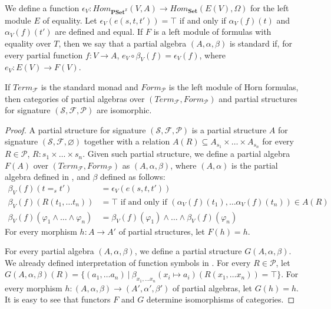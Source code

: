 \documentclass[reqno]{amsart}
\theoremstyle{definition}
\theoremstyle{remark}
\newcommand{\cat}[1]{\mathbf{#1}}
\newcommand{\Set}{\cat{Set}}
\newcommand{\PSet}{\cat{PSet}}
\numberwithin{figure}{section}
\begin{document}
We define a function $\epsilon_V : Hom_{\PSet^\mathcal{S}}(V,A) \to Hom_\Set(E(V),\Omega)$ for the left module $E$ of equality.
Let $\epsilon_V(e(s,t,t')) = \top$ if and only if $\alpha_V(f)(t)$ and $\alpha_V(f)(t')$ are defined and equal.
If $F$ is a left module of formulas with equality over $T$, then we say that a partial algebra $(A,\alpha,\beta)$ is standard
    if, for every partial function $f : V \to A$, $e_V \circ \beta_V(f) = \epsilon_V(f)$, where $e_V : E(V) \to F(V)$.

\begin{lem}
If $Term_\mathcal{F}$ is the standard monad and $Form_\mathcal{P}$ is the left module of Horn formulas,
    then categories of partial algebras over $(Term_\mathcal{F},Form_\mathcal{P})$ and partial structures for signature $(\mathcal{S},\mathcal{F},\mathcal{P})$ are isomorphic.
\end{lem}
\begin{proof}
A partial structure for signature $(\mathcal{S},\mathcal{F},\mathcal{P})$ is a partial structure $A$ for signature $(\mathcal{S},\mathcal{F},\varnothing)$
    together with a relation $A(R) \subseteq A_{s_1} \times \ldots \times A_{s_n}$ for every $R \in \mathcal{P}$, $R : s_1 \times \ldots \times s_n$.
Given such partial structure, we define a partial algebra $F(A)$ over $(Term_\mathcal{F},Form_\mathcal{P})$ as $(A,\alpha,\beta)$,
    where $(A,\alpha)$ is the partial algebra defined in , and $\beta$ defined as follows:
\begin{align*}
\beta_V(f)(t =_s t') & = \epsilon_V(e(s,t,t')) \\
\beta_V(f)(R(t_1, \ldots t_n)) & = \top \text{ if and only if } (\alpha_V(f)(t_1), \ldots \alpha_V(f)(t_n)) \in A(R) \\
\beta_V(f)(\varphi_1 \land \ldots \land \varphi_n) & = \beta_V(f)(\varphi_1) \land \ldots \land \beta_V(f)(\varphi_n)
\end{align*}
For every morphism $h : A \to A'$ of partial structures, let $F(h) = h$.

For every partial algebra $(A,\alpha,\beta)$, we define a partial structure $G(A,\alpha,\beta)$.
We already defined interpretation of function symbols in .
For every $R \in \mathcal{P}$, let $G(A,\alpha,\beta)(R) = \{ (a_1, \ldots a_n)\ |\ \beta_{x_1, \ldots x_n}(x_i \mapsto a_i)(R(x_1, \ldots x_n)) = \top \}$.
For every morphism $h : (A,\alpha,\beta) \to (A',\alpha',\beta')$ of partial algebras, let $G(h) = h$.
It is easy to see that functors $F$ and $G$ determine isomorphisms of categories.
\end{proof}
\end{document}
